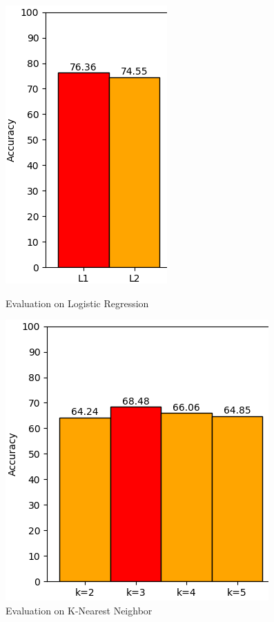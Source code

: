 \documentclass[a4paper,oneside]{article}
\begin{document}
\begin{figure}[h]
	\centering
	\begin{minipage}[t]{8.6cm}
\includegraphics[width=0.4\linewidth]{LR}
  \centering
  \caption{Evaluation on Logistic Regression}
  \label{fig:LR}
	\end{minipage}
	\begin{minipage}[t]{8.6cm}
	\includegraphics[width=0.65\linewidth]{KNN}
  \centering
  \caption{Evaluation on K-Nearest Neighbor}
  \label{fig:KNN}
	\end{minipage}
\end{figure}
\end{document}
